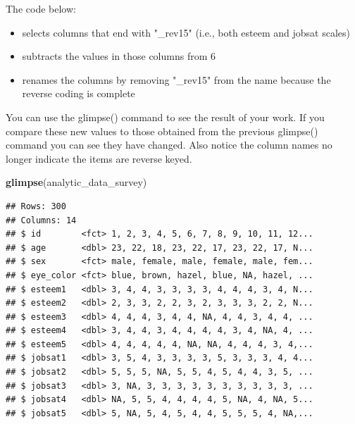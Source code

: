\documentclass[
]{krantz}
\makeatletter
\newenvironment{Shaded}{\begin{snugshade}}{\end{snugshade}}
\newcommand{\DataTypeTok}[1]{\textcolor[rgb]{0.27,0.27,0.27}{#1}}
\newcommand{\DecValTok}[1]{\textcolor[rgb]{0.06,0.06,0.06}{#1}}
\newcommand{\KeywordTok}[1]{\textcolor[rgb]{0.27,0.27,0.27}{\textbf{#1}}}
\newcommand{\NormalTok}[1]{#1}
\newcommand{\OperatorTok}[1]{\textcolor[rgb]{0.43,0.43,0.43}{\textbf{#1}}}
\newcommand{\StringTok}[1]{\textcolor[rgb]{0.5,0.5,0.5}{#1}}
\providecommand{\tightlist}{%
  \setlength{\itemsep}{0pt}\setlength{\parskip}{0pt}}
\newenvironment{kframe}{%
\medskip{}
\setlength{\fboxsep}{.8em}
 \def\at@end@of@kframe{}%
 \ifinner\ifhmode%
  \def\at@end@of@kframe{\end{minipage}}%
  \begin{minipage}{\columnwidth}%
 \fi\fi%
 \def\FrameCommand##1{\hskip\@totalleftmargin \hskip-\fboxsep
 \colorbox{shadecolor}{##1}\hskip-\fboxsep
     \hskip-\linewidth \hskip-\@totalleftmargin \hskip\columnwidth}%
 \MakeFramed {\advance\hsize-\width
   \@totalleftmargin\z@ \linewidth\hsize
   \@setminipage}}%
 {\par\unskip\endMakeFramed%
 \at@end@of@kframe}
\renewenvironment{Shaded}{\begin{kframe}}{\end{kframe}}
\makeatother
\begin{document}
The code below:

\begin{itemize}
\tightlist
\item
  selects columns that end with "\_rev15" (i.e., both esteem and jobsat scales)
\item
  subtracts the values in those columns from 6
\item
  renames the columns by removing "\_rev15" from the name because the reverse coding is complete
\end{itemize}

\begin{Shaded}
\end{Shaded}

You can use the glimpse() command to see the result of your work. If you compare these new values to those obtained from the previous glimpse() command you can see they have changed. Also notice the column names no longer indicate the items are reverse keyed.

\begin{Shaded}
\begin{Highlighting}[]
\KeywordTok{glimpse}\NormalTok{(analytic_data_survey)}
\end{Highlighting}
\end{Shaded}

\begin{verbatim}
## Rows: 300
## Columns: 14
## $ id        <fct> 1, 2, 3, 4, 5, 6, 7, 8, 9, 10, 11, 12...
## $ age       <dbl> 23, 22, 18, 23, 22, 17, 23, 22, 17, N...
## $ sex       <fct> male, female, male, female, male, fem...
## $ eye_color <fct> blue, brown, hazel, blue, NA, hazel, ...
## $ esteem1   <dbl> 3, 4, 4, 3, 3, 3, 3, 4, 4, 4, 3, 4, N...
## $ esteem2   <dbl> 2, 3, 3, 2, 2, 3, 2, 3, 3, 3, 2, 2, N...
## $ esteem3   <dbl> 4, 4, 4, 3, 4, 4, NA, 4, 4, 3, 4, 4, ...
## $ esteem4   <dbl> 3, 4, 4, 3, 4, 4, 4, 4, 3, 4, NA, 4, ...
## $ esteem5   <dbl> 4, 4, 4, 4, 4, NA, NA, 4, 4, 4, 3, 4,...
## $ jobsat1   <dbl> 3, 5, 4, 3, 3, 3, 3, 5, 3, 3, 3, 4, 4...
## $ jobsat2   <dbl> 5, 5, 5, NA, 5, 5, 4, 5, 4, 4, 3, 5, ...
## $ jobsat3   <dbl> 3, NA, 3, 3, 3, 3, 3, 3, 3, 3, 3, 3, ...
## $ jobsat4   <dbl> NA, 5, 5, 4, 4, 4, 4, 5, NA, 4, NA, 5...
## $ jobsat5   <dbl> 5, NA, 5, 4, 5, 4, 4, 5, 5, 5, 4, NA,...
\end{verbatim}
\end{document}
